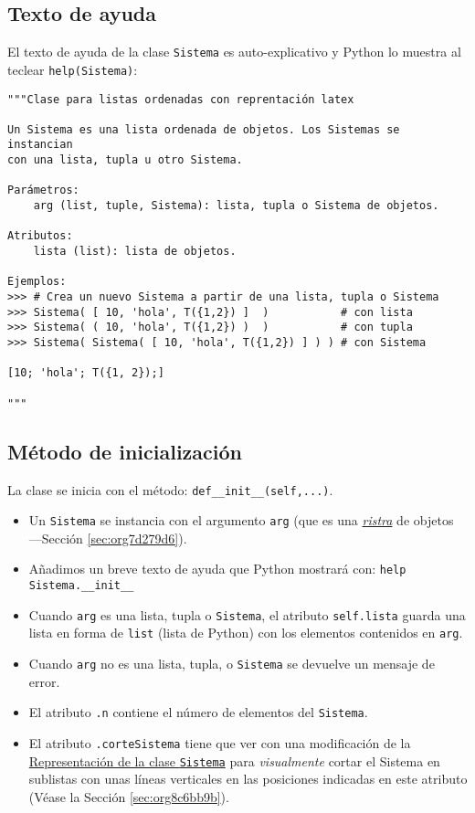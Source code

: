 \documentclass[11pt]{report}
\begin{document}
\subsection{Texto de ayuda}
\label{sec:org92529ef}

El texto de ayuda de la clase \texttt{Sistema} es auto-explicativo y Python
lo muestra al teclear \texttt{help(Sistema)}:

\begin{verbatim}
"""Clase para listas ordenadas con reprentación latex

Un Sistema es una lista ordenada de objetos. Los Sistemas se instancian
con una lista, tupla u otro Sistema. 

Parámetros:
    arg (list, tuple, Sistema): lista, tupla o Sistema de objetos.

Atributos:
    lista (list): lista de objetos.

Ejemplos:
>>> # Crea un nuevo Sistema a partir de una lista, tupla o Sistema
>>> Sistema( [ 10, 'hola', T({1,2}) ]  )           # con lista
>>> Sistema( ( 10, 'hola', T({1,2}) )  )           # con tupla
>>> Sistema( Sistema( [ 10, 'hola', T({1,2}) ] ) ) # con Sistema

[10; 'hola'; T({1, 2});]

"""
\end{verbatim}

\subsection{Método de inicialización}
\label{sec:orge1b00c4}

La clase se inicia con el método: \texttt{def\_\_init\_\_(self,...)}.

\begin{itemize}
\item Un \texttt{Sistema} se instancia con el argumento \texttt{arg} (que es una
\hyperref[sec:org7d279d6]{\emph{ristra}} de objetos ---Sección \ref{sec:org7d279d6}).

\item Añadimos un breve texto de ayuda que Python mostrará con: \texttt{help Sistema.\_\_init\_\_}

\item Cuando \texttt{arg} es una lista, tupla o \texttt{Sistema}, el atributo \texttt{self.lista}
guarda una lista en forma de \texttt{list} (lista de Python) con los
elementos contenidos en \texttt{arg}.

\item Cuando \texttt{arg} no es una lista, tupla, o \texttt{Sistema} se devuelve un
mensaje de error.

\item El atributo \texttt{.n} contiene el número de elementos del \texttt{Sistema}.

\item El atributo \texttt{.corteSistema} tiene que ver con una modificación
de la \hyperref[sec:org8c6bb9b]{Representación de la clase \texttt{Sistema}} para \emph{visualmente} cortar
el Sistema en sublistas con unas líneas verticales en las posiciones
indicadas en este atributo (Véase la Sección \ref{sec:org8c6bb9b}).
\end{itemize}
\end{document}
